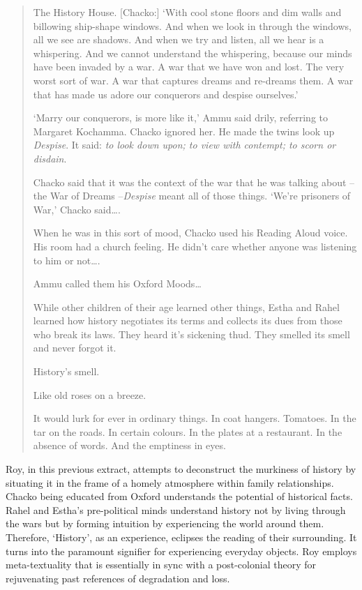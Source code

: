 \begin{quote}
  The History House. [Chacko:] `With cool stone floors and dim walls and 	billowing ship-shape windows. And when we look in through the windows, all we 	see are shadows. And when we try and listen, all we hear is a whispering. And we cannot understand the whispering, because our minds have been invaded by a war.	A war that we have won and lost. The very worst sort of war. A war that captures 	dreams and re-dreams them. A war that has made us adore our conquerors and despise ourselves.' 

  `Marry our conquerors, is more like it,' Ammu said drily, referring to Margaret Kochamma. Chacko ignored her. He made the twins look up \emph{Despise}. It said: \emph{to look down upon; to view with contempt; to scorn or disdain}. 

  Chacko said that it was the context of the war that he was talking about – the War 	of Dreams –\emph{Despise} meant all of those things. `We're prisoners of War,' Chacko said\ldots.

  When he was in this sort of mood, Chacko used his Reading Aloud voice. His 	room had a church feeling. He didn't care whether anyone was listening to him or not\ldots. 

  Ammu called them his Oxford Moods\ldots 

  While other children of their age learned other things, Estha and Rahel learned 	how history negotiates its terms and collects its dues from those who break its laws. They heard it's sickening thud. They smelled its smell and never forgot it. 

  History's smell.

  Like old roses on a breeze.

  It would lurk for ever in ordinary things. In coat hangers. Tomatoes. In the tar on the roads. In certain colours. In the plates at a restaurant. In the absence of words. And the emptiness in eyes. \parencite[53-55]{Roy1997}
\end{quote}

Roy, in this previous extract, attempts to deconstruct the murkiness of history by situating it in the frame of a homely atmosphere within family relationships. Chacko being educated from Oxford understands the potential of historical facts. Rahel and Estha's pre-political minds understand history not by living through the wars but by forming intuition by experiencing the world around them.  Therefore, `History', as an experience, eclipses the reading of their surrounding. It turns into the paramount signifier for experiencing everyday objects. Roy employs meta-textuality that is essentially in sync with a post-colonial theory for rejuvenating past references of degradation and loss. 

